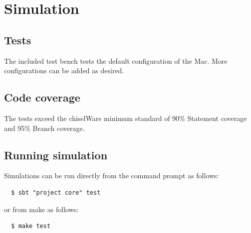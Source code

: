 \section{Simulation}

\subsection{Tests}
The included test bench tests the default configuration of the Mac. More configurations can be added as desired.

\subsection{Code coverage}

The tests exceed the chiselWare minimum standard of 90\% Statement coverage
and 95\% Branch coverage.

\subsection{Running simulation}

Simulations can be run directly from the command prompt as follows:

\begin{verbatim}
  $ sbt "project core" test
\end{verbatim}

or from make as follows:

\begin{verbatim}
  $ make test
\end{verbatim}